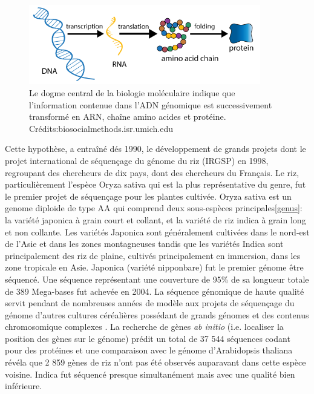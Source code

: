 \begin{figure}[!ht]
    \centering
    \includegraphics[width=0.90\textwidth]{hdr_manuscript/Figures/central-dogma.png}
    \caption{Le dogme central de la biologie moléculaire indique que l'information contenue dans l'ADN génomique est successivement transformé en ARN, chaîne amino acides et protéine. Crédits:biosocialmethods.isr.umich.edu}
    \label{fig:dogma}
\end{figure}



Cette hypothèse, a entraîné dés 1990, le développement de grands projets dont le projet international de séquençage du génome du riz (IRGSP) en 1998, regroupant des chercheurs de dix pays, dont des chercheurs du Français. Le riz, particulièrement l'espèce Oryza sativa qui est la plus représentative du genre, fut le premier projet de séquençage pour les plantes cultivée. Oryza sativa est un genome diploide de type AA qui comprend deux sous-espèces principales\ref{genus}: la variété japonica à grain court et collant, et la variété de riz indica à grain long et non collante. Les variétés Japonica sont généralement cultivées dans le nord-est de l'Asie et dans les zones montagneuses tandis que les variétés Indica sont principalement des riz de plaine, cultivés principalement en immersion, dans les zone tropicale en Asie. Japonica (variété nipponbare) fut le premier génome être séquencé. Une séquence représentant une couverture de 95\% de sa longueur totale de 389 Mega-bases fut achevée en 2004. La séquence génomique de haute qualité servit pendant de nombreuses années de modèle aux projets de séquençage du génome d'autres cultures céréalières possédant de grands génomes et des contenus chromosomique complexes \cite{matsumoto_nipponbare_2016}. La recherche de gènes  \textit{ab initio} (i.e. localiser la position des gènes sur le génome) prédit un total de 37 544 séquences codant pour des protéines et une comparaison avec le génome d'Arabidopsis thaliana révéla que 2 859 gènes de riz n'ont pas été observés auparavant dans cette espèce voisine. Indica fut séquencé presque simultanément mais avec une qualité bien inférieure.\\

